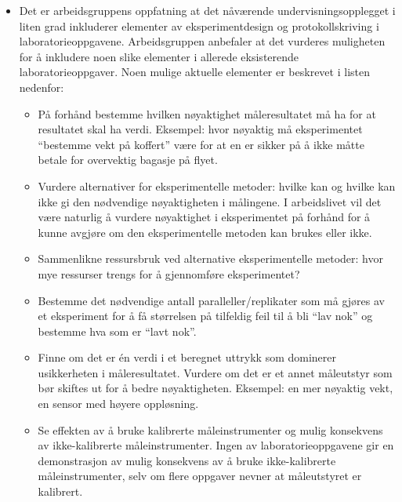 \documentclass{article}
\begin{document}
\begin{itemize}
 

  \item Det er arbeidsgruppens oppfatning at det nåværende undervisningsopplegget i liten grad inkluderer elementer av eksperimentdesign og protokollskriving i laboratorieoppgavene. Arbeidsgruppen anbefaler at det vurderes muligheten for å inkludere noen slike elementer i allerede eksisterende laboratorieoppgaver. Noen mulige aktuelle elementer er beskrevet i listen nedenfor:
    
    \begin{itemize}
      \item På forhånd bestemme hvilken nøyaktighet måleresultatet må ha for at resultatet skal ha verdi. Eksempel: hvor nøyaktig må eksperimentet ``bestemme vekt på koffert'' være for at en er sikker på å ikke måtte betale for overvektig bagasje på flyet.
      \item Vurdere alternativer for eksperimentelle metoder: hvilke kan og hvilke kan ikke gi den nødvendige nøyaktigheten i målingene. I arbeidslivet vil det være naturlig å vurdere nøyaktighet i eksperimentet på forhånd for å kunne avgjøre om den eksperimentelle metoden kan brukes eller ikke. 
      \item Sammenlikne ressursbruk ved alternative eksperimentelle metoder: hvor mye ressurser trengs for å gjennomføre eksperimentet?
      \item Bestemme det nødvendige antall paralleller/replikater som må gjøres av et eksperiment for å få størrelsen på tilfeldig feil til å bli ``lav nok'' og bestemme hva som er ``lavt nok''.
      \item Finne om det er én verdi i et beregnet uttrykk som dominerer usikkerheten i måleresultatet. Vurdere om det er et annet måleutstyr som bør skiftes ut for å bedre nøyaktigheten. Eksempel: en mer nøyaktig vekt, en sensor med høyere oppløsning.
      \item Se effekten av å bruke kalibrerte måleinstrumenter og mulig konsekvens av ikke-kalibrerte måleinstrumenter. Ingen av laboratorieoppgavene gir en demonstrasjon av mulig konsekvens av å bruke ikke-kalibrerte måleinstrumenter, selv om flere oppgaver nevner at måleutstyret er kalibrert. 
    \end{itemize}

\end{itemize}
\end{document}
